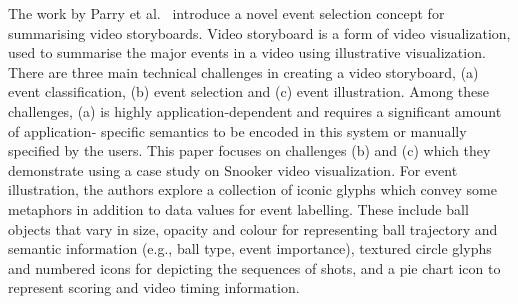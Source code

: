 
The work by Parry et al.~\cite{parry11} introduce a novel event selection concept for summarising video storyboards. Video storyboard is a form of video visualization, used to summarise the major events in a video using illustrative visualization.
There are three main technical challenges in creating a video storyboard, (a) event classification, (b) event selection and 
(c) event illustration. Among these challenges, (a) is highly application-dependent and requires a significant amount of application- 
specific semantics to be encoded in this system or manually specified by the users. 
This paper focuses on challenges (b) and (c) which they demonstrate using a case study on Snooker video visualization. 
For event illustration, the authors explore a collection of iconic glyphs which convey some metaphors in addition to data values for event labelling. 
These include ball objects that vary in size, opacity and colour for representing ball trajectory and semantic information (e.g., ball type, event importance), textured circle glyphs and numbered icons for depicting the sequences of shots, and a pie chart icon to represent scoring and video timing information.

